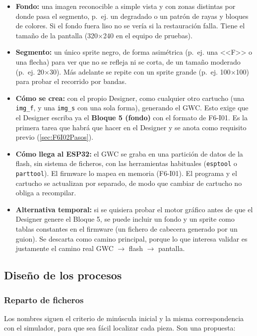 \begin{itemize}
	\item \textbf{Fondo:} una imagen reconocible a simple vista y con zonas distintas por donde pasa el segmento, p.~ej. un degradado o un patrón de rayas y bloques de colores. Si el fondo fuera liso no se vería si la restauración falla. Tiene el tamaño de la pantalla (320$\times$240 en el equipo de pruebas).
	\item \textbf{Segmento:} un único sprite negro, de forma asimétrica (p.~ej. una <<F>> o una flecha) para ver que no se refleja ni se corta, de un tamaño moderado (p.~ej. 20$\times$30). Más adelante se repite con un sprite grande (p.~ej. 100$\times$100) para probar el recorrido por bandas.
	\item \textbf{Cómo se crea:} con el propio Designer, como cualquier otro cartucho (una \texttt{img\_f}, y una \texttt{img\_s} con una sola forma), generando el GWC. Esto exige que el Designer escriba ya el \textbf{Bloque 5 (fondo)} con el formato de F6-I01. Es la primera tarea que habrá que hacer en el Designer y se anota como requisito previo (\ref{sec:F6I02Pasos}).
	\item \textbf{Cómo llega al ESP32:} el GWC se graba en una partición de datos de la flash, sin sistema de ficheros, con las herramientas habituales (\texttt{esptool} o \texttt{parttool}). El firmware lo mapea en memoria (F6-I01). El programa y el cartucho se actualizan por separado, de modo que cambiar de cartucho no obliga a recompilar.
	\item \textbf{Alternativa temporal:} si se quisiera probar el motor gráfico antes de que el Designer genere el Bloque 5, se puede incluir un fondo y un sprite como tablas constantes en el firmware (un fichero de cabecera generado por un guion). Se descarta como camino principal, porque lo que interesa validar es justamente el camino real GWC $\rightarrow$ flash $\rightarrow$ pantalla.
\end{itemize}

\subsection{Diseño de los procesos}
\label{sec:F6I02Diseno}

\subsubsection{Reparto de ficheros}

Los nombres siguen el criterio de minúscula inicial y la misma correspondencia con el simulador, para que sea fácil localizar cada pieza. Son una propuesta:

